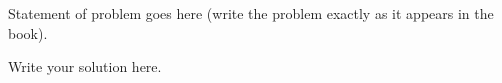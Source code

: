 \begin{problem}{3} 
    Statement of problem goes here (write the problem exactly as it appears in the book).
\end{problem}



\begin{sol}
    Write your solution here.
\end{sol}